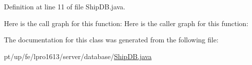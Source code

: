 Definition at line 11 of file Ship\+D\+B.\+java.

Here is the call graph for this function\+:
Here is the caller graph for this function\+:


The documentation for this class was generated from the following file\+:\begin{DoxyCompactItemize}
\item 
pt/up/fe/lpro1613/server/database/\hyperlink{_ship_d_b_8java}{Ship\+D\+B.\+java}\end{DoxyCompactItemize}
